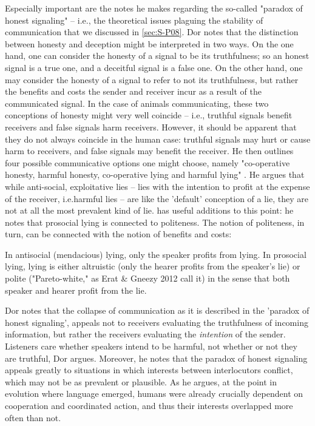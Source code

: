 Especially important are the notes he makes regarding the so-called "paradox of honest signaling" \citep[p.~45]{Dor17} -- i.e., the theoretical issues plaguing the stability of communication that we discussed in \cref{sec:S-P08}. Dor notes that the distinction between honesty and deception might be interpreted in two ways. On the one hand, one can consider the honesty of a signal to be its truthfulness; so an honest signal is a true one, and a deceitful signal is a false one. On the other hand, one may consider the honesty of a signal to refer to not its truthfulness, but rather the benefits and costs the sender and receiver incur as a result of the communicated signal. In the case of animals communicating, these two conceptions of honesty might very well coincide -- i.e., truthful signals benefit receivers and false signals harm receivers. However, it should be apparent that they do not always coincide in the human case: truthful signals may hurt or cause harm to receivers, and false signals may benefit the receiver. 
He then outlines four possible communicative options one might choose, namely "co-operative honesty, harmful honesty, co-operative lying and harmful lying" \citep[p.~45]{Dor17}.
He argues that while anti-social, exploitative lies -- lies with the intention to profit at the expense of the receiver, i.e.\@ harmful lies -- are like the 'default' conception of a lie, they are not at all the most prevalent kind of lie. \citet{Meibauer18} has useful additions to this point: he notes that prosocial lying is connected to politeness. The notion of politeness, in turn, can be connected with the notion of benefits and costs:
\begin{quoting}
    In antisocial (mendacious) lying, only the speaker profits from lying. In prosocial lying, lying is either altruistic (only the hearer profits from the speaker's lie) or polite ("Pareto-white," as Erat \& Gneezy 2012 call it) in the sense that both speaker and hearer profit from the lie.
\end{quoting}

Dor notes that the collapse of communication as it is described in the 'paradox of honest signaling', appeals not to receivers evaluating the truthfulness of incoming information, but rather the receivers evaluating the \emph{intention} of the sender. Listeners care whether speakers intend to be harmful, not whether or not they are truthful, Dor argues.
Moreover, he notes that the paradox of honest signaling appeals greatly to situations in which interests between interlocutors conflict, which may not be as prevalent or plausible. As he argues, at the point in evolution where language emerged, humans were already crucially dependent on cooperation and coordinated action, and thus their interests overlapped more often than not.

